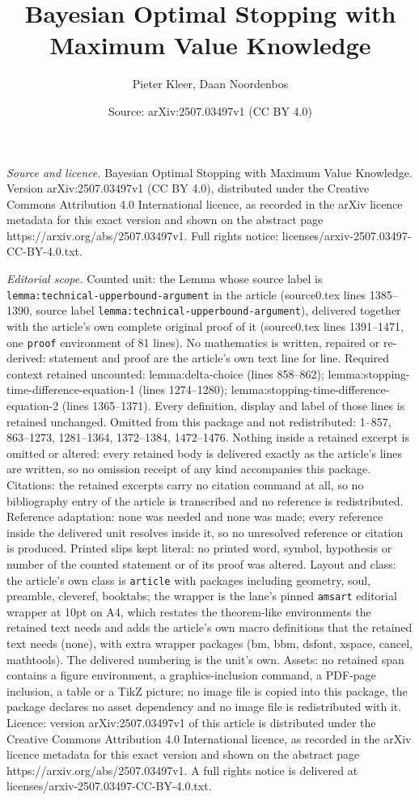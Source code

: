 \documentclass[10pt,a4paper]{amsart}
\title[Bayesian Optimal Stopping with Maximum Value Knowledge]{Bayesian Optimal Stopping with Maximum Value Knowledge}
\author{Pieter Kleer, Daan Noordenbos}
\date{Source: arXiv:2507.03497v1 (CC BY 4.0)}
\begin{document}
\maketitle

\noindent\emph{Source and licence.} Bayesian Optimal Stopping with Maximum Value Knowledge. Version arXiv:2507.03497v1 (CC BY 4.0), distributed under the Creative Commons Attribution 4.0 International licence, as recorded in the arXiv licence metadata for this exact version and shown on the abstract page https://arxiv.org/abs/2507.03497v1. Full rights notice: licenses/arxiv-2507.03497-CC-BY-4.0.txt.\par\smallskip

\noindent\textit{Editorial scope.} Counted unit: the Lemma whose source label is \texttt{lemma:technical-upperbound-argument} in the article (source0.tex lines 1385--1390, source label \texttt{lemma:technical-upperbound-argument}), delivered together with the article's own complete original proof of it (source0.tex lines 1391--1471, one \texttt{proof} environment of 81 lines). No mathematics is written, repaired or re-derived: statement and proof are the article's own text line for line. Required context retained uncounted: lemma:delta-choice (lines 858--862); lemma:stopping-time-difference-equation-1 (lines 1274--1280); lemma:stopping-time-difference-equation-2 (lines 1365--1371). Every definition, display and label of those lines is retained unchanged. Omitted from this package and not redistributed: 1--857, 863--1273, 1281--1364, 1372--1384, 1472--1476. Nothing inside a retained excerpt is omitted or altered: every retained body is delivered exactly as the article's lines are written, so no omission receipt of any kind accompanies this package. Citations: the retained excerpts carry no citation command at all, so no bibliography entry of the article is transcribed and no reference is redistributed. Reference adaptation: none was needed and none was made; every reference inside the delivered unit resolves inside it, so no unresolved reference or citation is produced. Printed slips kept literal: no printed word, symbol, hypothesis or number of the counted statement or of its proof was altered. Layout and class: the article's own class is \texttt{article} with packages including geometry, soul, preamble, cleveref, booktabs; the wrapper is the lane's pinned \texttt{amsart} editorial wrapper at 10pt on A4, which restates the theorem-like environments the retained text needs and adds the article's own macro definitions that the retained text needs (none), with extra wrapper packages (bm, bbm, dsfont, xspace, cancel, mathtools). The delivered numbering is the unit's own. Assets: no retained span contains a figure environment, a graphics-inclusion command, a PDF-page inclusion, a table or a TikZ picture; no image file is copied into this package, the package declares no asset dependency and no image file is redistributed with it. Licence: version arXiv:2507.03497v1 of this article is distributed under the Creative Commons Attribution 4.0 International licence, as recorded in the arXiv licence metadata for this exact version and shown on the abstract page https://arxiv.org/abs/2507.03497v1. A full rights notice is delivered at licenses/arxiv-2507.03497-CC-BY-4.0.txt. 
\end{document}
